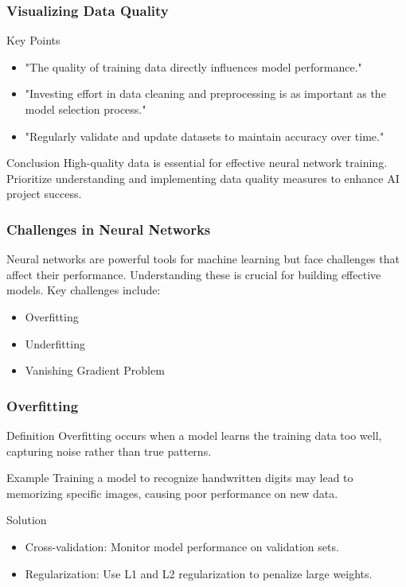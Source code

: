\documentclass[aspectratio=169]{beamer}
\begin{document}
\begin{frame}[fragile]
    \frametitle{Visualizing Data Quality}
    \begin{block}{Key Points}
        \begin{itemize}
            \item "The quality of training data directly influences model performance."
            \item "Investing effort in data cleaning and preprocessing is as important as the model selection process."
            \item "Regularly validate and update datasets to maintain accuracy over time."
        \end{itemize}
    \end{block}
    \begin{block}{Conclusion}
        High-quality data is essential for effective neural network training. Prioritize understanding and implementing data quality measures to enhance AI project success.
    \end{block}
\end{frame}

\begin{frame}[fragile]
    \frametitle{Challenges in Neural Networks}
    Neural networks are powerful tools for machine learning but face challenges that affect their performance. Understanding these is crucial for building effective models. Key challenges include:
    \begin{itemize}
        \item Overfitting
        \item Underfitting
        \item Vanishing Gradient Problem
    \end{itemize}
\end{frame}

\begin{frame}[fragile]
    \frametitle{Overfitting}
    \begin{block}{Definition}
        Overfitting occurs when a model learns the training data too well, capturing noise rather than true patterns. 
    \end{block}
    
    \begin{block}{Example}
        Training a model to recognize handwritten digits may lead to memorizing specific images, causing poor performance on new data.
    \end{block}
    
    \begin{block}{Solution}
        \begin{itemize}
            \item Cross-validation: Monitor model performance on validation sets.
            \item Regularization: Use L1 and L2 regularization to penalize large weights.
        \end{itemize}
    \end{block}
\end{frame}
\end{document}

